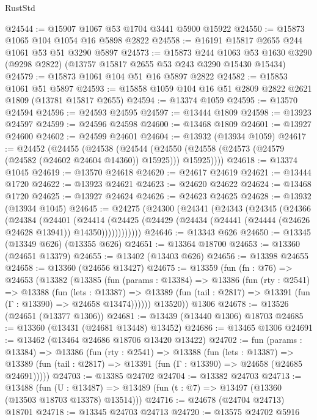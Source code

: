 \begin{lexlean}{RustStd}
\begin{coremodule}
@24544 := @15907 @1067 @53 @1704 @3441 @5900 @15922
@24550 := @15873 @1065 @104 @1054 @16 @5898 @2822
@24558 := @16191 @15817 @2655 @244 @1061 @53 @51 @3290 @5897
@24573 := @15873
    @244
    @1063
    @53
    @1630
    @3290
    (@9298 @2822)
    (@13757 @15817 @2655 @53 @243 @3290 @15430 @15434)
@24579 := @15873 @1061 @104 @51 @16 @5897 @2822
@24582 := @15853 @1061 @51 @5897
@24593 := @15858 @1059 @104 @16 @51 @2809 @2822 @2621 @1809 (@13781 @15817 @2655)
@24594 := @13374 @1059
@24595 := @13570 @24594
@24596 := @24593 @24595
@24597 := @13444 @1809
@24598 := @13923 @24597
@24599 := @24596 @24598
@24600 := @13468 @1809
@24601 := @13927 @24600
@24602 := @24599 @24601
@24604 := @13932 (@13934 @1059)
@24617 := @24452
    (@24455
      (@24538
        (@24544 (@24550 (@24558 (@24573 (@24579 (@24582 (@24602 @24604 @14360)) @15925))) @15925))))
@24618 := @13374 @1045
@24619 := @13570 @24618
@24620 := @24617 @24619
@24621 := @13444 @1720
@24622 := @13923 @24621
@24623 := @24620 @24622
@24624 := @13468 @1720
@24625 := @13927 @24624
@24626 := @24623 @24625
@24628 := @13932 (@13934 @1045)
@24645 := @24275
    (@24300
      (@24341
        (@24343
          (@24345
            (@24366
              (@24384
                (@24401
                  (@24414
                    (@24425
                      (@24429 (@24434 (@24441 (@24444 (@24626 @24628 @13941)) @14350))))))))))))
@24646 := @13343 @626
@24650 := @13345 (@13349 @626) (@13355 @626)
@24651 := @13364 @18700
@24653 := @13360 (@24651 @13379)
@24655 := @13402 (@13403 @626)
@24656 := @13398 @24655
@24658 := @13360 (@24656 @13427)
@24675 := @13359
    (fun (fn : @76) =>
    @24653
      (@13382
        (@13385
          (fun (params : @13384) =>
          @13386
            (fun (rty : @2541) =>
            @13388
              (fun (lets : @13387) =>
              @13389 (fun (tail : @2817) => @13391 (fun (Γ : @13390) => @24658 @13474))))))
        @13520))
    @1306
@24678 := @13526 (@24651 (@13377 @1306))
@24681 := @13439 (@13440 @1306) @18703
@24685 := @13360 (@13431 (@24681 @13448) @13452)
@24686 := @13465 @1306
@24691 := @13462 (@13464 @24686 @18706 @13420 @13422)
@24702 := fun (params : @13384) =>
  @13386
    (fun (rty : @2541) =>
    @13388
      (fun (lets : @13387) =>
      @13389 (fun (tail : @2817) => @13391 (fun (Γ : @13390) => @24658 (@24685 @24691)))))
@24703 := @13385 @24702
@24704 := @13382 @24703
@24713 := @13488
    (fun (U : @13487) => @13489 (fun (t : @7) => @13497 (@13360 (@13503 @18703 @13378) @13514)))
@24716 := @24678 (@24704 @24713) @18701
@24718 := @13345 @24703 @24713
@24720 := @13575 @24702 @5916

\end{coremodule}
\end{lexlean}
